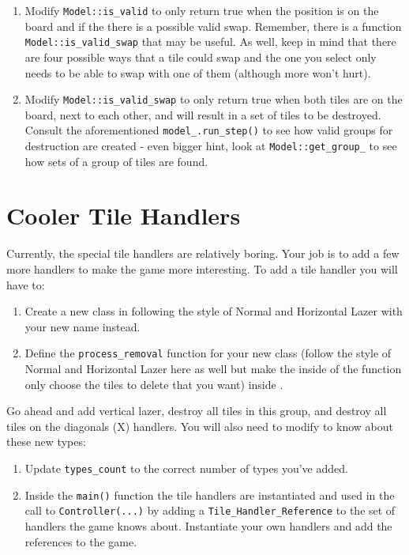 \documentclass{tufte-handout}
\begin{document}
\begin{enumerate}
  \item Modify \verb!Model::is_valid! to only return true when the position is
    on the board and if the there is a possible valid swap. Remember, there is
    a function \verb!Model::is_valid_swap! that may be useful. As well, keep in
    mind that there are four possible ways that a tile could swap and the one
    you select only needs to be able to swap with one of them (although more
    won't hurt).

  \item Modify \verb!Model::is_valid_swap! to only return true when both tiles
    are on the board, next to each other, and will result in a set of tiles to
    be destroyed. Consult the aforementioned \verb!model_.run_step()! to see how
    valid groups for destruction are created - even bigger hint, look at
    \verb!Model::get_group_! to see how sets of a group of tiles are found.
\end{enumerate}

\section{Cooler Tile Handlers}

Currently, the special tile handlers are relatively boring. Your job is to add
a few more handlers to make the game more interesting. To add a tile handler
you will have to:

\begin{enumerate}
  \item Create a new class in  following the style
    of Normal and Horizontal Lazer with your new name instead.

  \item Define the \verb!process_removal! function for your new class (follow
    the style of Normal and Horizontal Lazer here as well but make the inside
    of the function only choose the tiles to delete that you want) inside
    .
\end{enumerate}

Go ahead and add vertical lazer, destroy all tiles in this group, and
destroy all tiles on the diagonals (X) handlers. You will also need to modify
 to know about these new types:

\begin{enumerate}
    \item Update \verb!types_count! to the correct number of types you've added.

    \item Inside the \verb!main()! function the tile handlers are instantiated
      and used in the call to \verb!Controller(...)! by adding a
      \verb!Tile_Handler_Reference! to the set of handlers the game knows about.
      Instantiate your own handlers and add the references to the game.
\end{enumerate}
\end{document}
